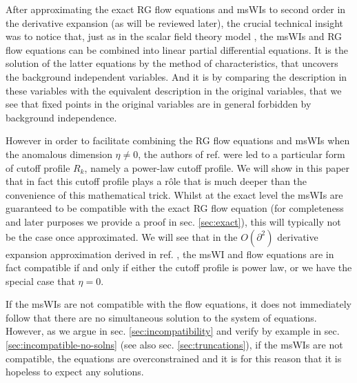 \documentclass[11pt,a4paper]{article}
\numberwithin{figure}{section}
\numberwithin{equation}{section}
\begin{document}
After approximating the exact RG flow equations and msWIs to second order in the derivative expansion (as will be reviewed later), 
the crucial technical insight was to notice that, just as in the scalar field theory model \cite{Bridle:2013sra}, the msWIs and RG flow equations can be combined into linear partial differential equations. It is the solution of the latter equations by the method of characteristics, that uncovers the background independent variables. And it is by comparing the description in these variables with the equivalent description in the original variables,
that we see that fixed points in the original variables are in general forbidden by  background independence.

However in order to facilitate combining the RG flow equations and msWIs when the anomalous dimension $\eta\ne0$, the authors of ref. \cite{Dietz:2015owa} were led to a particular form of cutoff profile $R_k$, namely a power-law cutoff profile. We will show in this paper that in fact this cutoff profile plays a r\^ole that is much deeper than the convenience of this mathematical trick. 
Whilst at the exact level the msWIs are guaranteed to be compatible with the exact RG flow equation (for completeness and later purposes we provide a proof in sec. \ref{sec:exact}), this will typically not be the case once approximated. 
We will see that in the $O(\partial^2)$ derivative expansion approximation derived in ref. \cite{Dietz:2015owa}, the msWI and flow equations are in fact compatible {if and only if} either the cutoff profile is power law, or we have the special case that $\eta=0$.


If the msWIs are not compatible with the flow equations, it does not immediately follow that there are no simultaneous solution to the system of equations. However, as we argue in sec. \ref{sec:incompatibility} and verify by example in sec. \ref{sec:incompatible-no-solns} (see also sec. \ref{sec:truncations}), if the msWIs are not compatible, the equations are overconstrained and it is for this reason that it is hopeless to expect any solutions.
\end{document}
